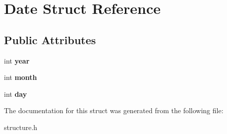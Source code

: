 \hypertarget{structDate}{}\section{Date Struct Reference}
\label{structDate}
\subsection*{Public Attributes}
\begin{DoxyCompactItemize}
\item 
\mbox{\label{structDate_a3eeced2ed56bc95d56782b9e738db8ea}} 
int {\bfseries year}
\item 
\mbox{\label{structDate_a533843e07c6ac8d19fee9b16f5336ba2}} 
int {\bfseries month}
\item 
\mbox{\label{structDate_a5b192adcabf2b2871e3f0b76c1ec1601}} 
int {\bfseries day}
\end{DoxyCompactItemize}


The documentation for this struct was generated from the following file\+:\begin{DoxyCompactItemize}
\item 
structure.\+h\end{DoxyCompactItemize}
